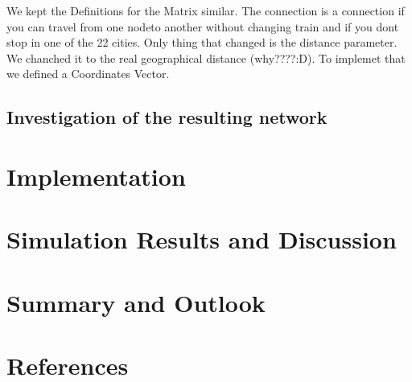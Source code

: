 \documentclass[11pt]{article}
\begin{document}
We kept the Definitions for the Matrix similar. The connection is a connection if you can travel from one nodeto another without changing train and if you dont stop in one of the 22 cities. Only thing that changed is the distance parameter. We chanched it to the real geographical distance (why????:D). To implemet that we defined a Coordinates Vector.


\subsection{Investigation of the resulting network}



\section{Implementation}

\section{Simulation Results and Discussion}

\section{Summary and Outlook}

\section{References}
\end{document}
